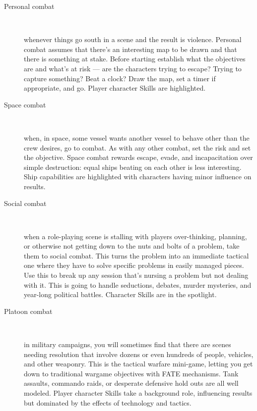 \begin{description}
\item[Personal combat] ~

whenever things go south in a scene and the result is violence. Personal combat assumes that there's an interesting map to be drawn and that there is something at stake. Before starting establish what the objectives are and what's at risk --- are the characters trying to escape? Trying to capture something? Beat a clock? Draw the map, set a timer if appropriate, and go. Player character Skills are highlighted.

\item[Space combat] ~

when, in space, some vessel wants another vessel to behave other than the crew desires, go to combat. As with any other combat, set the risk and set the objective. Space combat rewards escape, evade, and incapacitation over simple destruction: equal ships beating on each other is less interesting. Ship capabilities are highlighted with characters having minor influence on results.

\item[Social combat] ~

when a role-playing scene is stal\-ling with players over-thinking, planning, or otherwise not getting down to the nuts and bolts of a problem, take them to social combat. This turns the problem into an immediate tactical one where they have to solve specific problems in easily managed pieces. Use this to break up any session that's nursing a problem but not dealing with it. This is going to handle seductions,  debates, murder mysteries, and year-long political battles. Character Skills are in the spotlight.

\item[Platoon combat] ~

in military campaigns, you will sometimes find that there are scenes needing resolution that involve dozens or even hundreds of people, vehicles, and other weaponry. This is the tactical warfare mini-game, letting you get down to traditional wargame objectives with FATE mechanisms. Tank assaults, commando raids, or desperate defensive hold outs are all well modeled. Player character Skills take a background role, influencing results but dominated by the effects of technology and tactics.
\end{description}

